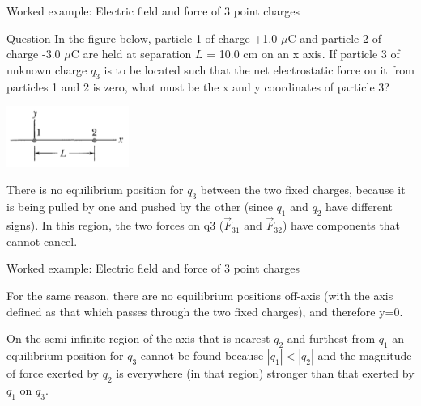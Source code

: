 {
\problemslide

\begin{frame}{Worked example: Electric field and force of 3 point charges}

\begin{blockexmplque}{Question}
  In the figure below, particle 1 of charge +1.0 $\mu$C and particle 2
  of charge -3.0 $\mu$C are held at separation $L$ = 10.0 cm on an x axis.
  If particle 3 of unknown charge $q_3$ is to be located such that the net
  electrostatic force on it from particles 1 and 2 is zero,
  what must be the x and y coordinates of particle 3?
  \begin{center}
      \includegraphics[width=0.30\textwidth]{./images/problems/lect01_3charges_0_net_force_on_third.png}
  \end{center}
\end{blockexmplque}

\vspace{0.2cm}

There is no equilibrium position for $q_3$ between the two fixed charges,
because it is being pulled by one and pushed by the other
(since $q_1$ and $q_2$ have different signs).
In this region, the two forces on q3 ($\vec{F}_{31}$ and $\vec{F}_{32}$)
have components that cannot cancel.

\end{frame}

%
%
%

\begin{frame}{Worked example: Electric field and force of 3 point charges}

  For the same reason, there are no equilibrium positions off-axis
  (with the axis defined as that which passes through the two fixed charges),
  and therefore y=0.\\
  \vspace{0.3cm}

  On the semi-infinite region of the axis that is nearest $q_2$
  and furthest from $q_1$ an equilibrium position for $q_3$ cannot be found
  because $|q_1| < |q_2|$ and the magnitude of force exerted by $q_2$
  is everywhere (in that region) stronger than that exerted by $q_1$ on $q_3$.\\
  \vspace{0.3cm}


\end{frame}}
